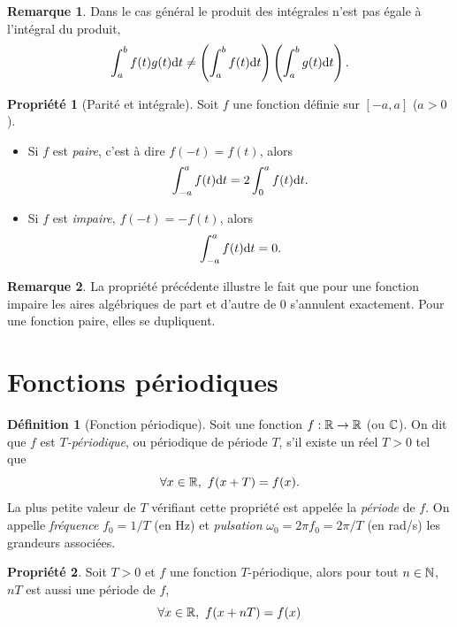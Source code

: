 \documentclass[a4paper,11pt]{article}
\theoremstyle{definition}
\newtheorem{definition}{Définition}[section]
\newtheorem{proposition}{Propriété}[section]
\newtheorem{remark}{Remarque}[section]
\newcommand{\highlight}[1]{{\color{niceblue}\emph{#1}}}
\begin{document}
\begin{remark}
     Dans le cas général le produit des intégrales n'est pas égale à l'intégral du produit,
    $$
        \int_a^b f(t)g(t) {\rm d} t \neq \left(\int_a^b f(t) {\rm d} t\right)\left(\int_a^b g(t){\rm d} t\right).
    $$
\end{remark}

\begin{proposition}[Parité et intégrale]
    Soit $f$ une fonction définie sur $[-a,a]$ ($a>0$).
    \begin{itemize}
        \item Si $f$ est \highlight{paire}, c'est à dire $f(-t) = f(t)$, alors
        $$
            \int_{-a}^{a} f(t){\rm d} t = 2\int_{0}^{a} f(t){\rm d} t.
        $$
        \item Si $f$ est \highlight{impaire}, $f(-t) = -f(t)$, alors
        $$
            \int_{-a}^{a} f(t){\rm d} t = 0.
        $$
    \end{itemize}
\end{proposition}

\begin{remark}
   La propriété précédente illustre le fait que pour une fonction impaire les aires algébriques de part et d'autre de $0$ s'annulent exactement. Pour une fonction paire, elles se dupliquent.
\end{remark}




\section{Fonctions périodiques}

\begin{definition}[Fonction périodique]
    Soit une fonction $f : {\mathbb{R}} \to {\mathbb{R}}$ (ou ${\mathbb{C}}$). On dit que $f$ est \highlight{$T$-périodique}, ou périodique de période $T$, s'il existe un réel $T > 0$ tel que
    $$
        \forall x\in{\mathbb{R}},\ f(x+T) = f(x).
    $$
    La plus petite valeur de $T$ vérifiant cette propriété est appelée la \highlight{période} de $f$. On appelle \highlight{fréquence} $f_0 = 1/T$ (en Hz) et \highlight{pulsation} $\omega_0 = 2\pi f_0 = 2\pi/T$ (en rad/s) les grandeurs associées.
\end{definition}

\begin{proposition}
    Soit $T>0$ et $f$ une fonction $T$-périodique, alors pour tout $n\in {\mathbb{N}}$, $nT$ est aussi une période de $f$,
    $$
      \forall x\in{\mathbb{R}},\  f(x + nT) = f(x)
    $$
\end{proposition}
\end{document}
